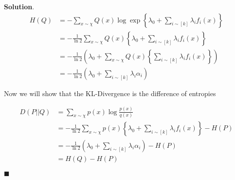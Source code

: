 \documentclass[12pt]{article}
\theoremstyle{definition}
\newenvironment{s}{%
        \begin{trivlist} \item \textbf{Solution}. }{%
            \hspace*{\fill} $\blacksquare$\end{trivlist}}%
\begin{document}
{\begin{s}
\begin{align*}
H(Q) &= -\sum_{x\sim \chi} Q(x)\log\exp\left\{\lambda_{0} + \sum_{i\sim [k]} \lambda_{i}f_{i}(x)\right\}\\ 
&= -\frac{1}{\ln 2}\sum_{x\sim \chi} Q(x)\left\{\lambda_{0} + \sum_{i\sim [k]} \lambda_{i}f_{i}(x)\right\}\\
&= -\frac{1}{\ln 2}\left(\lambda_{0} + \sum_{x\sim \chi} Q(x)\left\{\sum_{i\sim [k]} \lambda_{i}f_{i}(x)\right\}\right)\\
&= -\frac{1}{\ln 2}\left(\lambda_{0} + \sum_{i\sim [k]} \lambda_{i}\alpha_{i}\right)
\end{align*}

Now we will show that the KL-Divergence is the difference of entropies

\begin{align*}
D(P||Q) &= \sum_{x\sim \chi} p(x)\log\frac{p(x)}{q(x)}\\
&= -\frac{1}{\ln 2}\sum_{x\sim \chi} p(x)\left\{\lambda_{0} + \sum_{i\sim [k]} \lambda_{i}f_{i}(x)\right\} - H(P)\\
&= -\frac{1}{\ln 2}\left(\lambda_{0} + \sum_{i\sim [k]} \lambda_{i}\alpha_{i}\right) - H(P)\\
&= H(Q) - H(P)
\end{align*}

\end{s}
\end{document}
